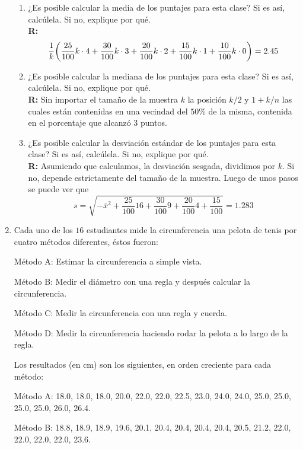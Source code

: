\documentclass[10pt,a4paper]{book}
\begin{document}
\begin{enumerate}
	\begin{enumerate}
		\item ¿Es posible calcular la media de los puntajes para esta clase? Si es así, calcúlela. Si no, explique por qué.\\
		\textbf{R:} $$ \frac{1}{k}\bigg{(}\frac{25}{100}k\cdot4 + \frac{30}{100}k\cdot3 + \frac{20}{100}k\cdot2 + \frac{15}{100}k\cdot1 + \frac{10}{100}k\cdot0 \bigg{)} = 2.45$$
		
		\item ¿Es posible calcular la mediana de los puntajes para esta clase? Si es así, calcúlela. Si no, explique por qué.\\
		\textbf{R:} Sin importar el tamaño de la muestra $ k $ la posición $ k/2 $ y $ 1+ k/n $ las cuales están contenidas en una vecindad del $ 50\% $ de la misma, contenida en el porcentaje que alcanzó $ 3 $ puntos.
		
		\item ¿Es posible calcular la desviación estándar de los puntajes para esta clase? Si es así, calcúlela. Si no, explique por qué.\\
		\textbf{R:} Asumiendo que calculamos, la desviación sesgada, dividimos por $k$. Si no, depende estrictamente del tamaño de la muestra. Luego de unos pasos se puede ver que
		$$s = \sqrt{-\overline{x}^2 + \frac{25}{100}16 +\frac{30}{100}9 +\frac{20}{100}4 + \frac{15}{100} } = 1.283 $$
	\end{enumerate}

	\item Cada uno de los $ 16 $ estudiantes mide la circunferencia una pelota de tenis por cuatro métodos diferentes, éstos fueron:
	
	Método A: Estimar la circunferencia a simple vista.
	
	Método B: Medir el diámetro con una regla y después calcular la circunferencia.
	
	Método C: Medir la circunferencia con una regla y cuerda.
	
	Método D: Medir la circunferencia haciendo rodar la pelota a lo largo de la regla.
	
	Los resultados (en cm) son los siguientes, en orden creciente para cada método:
	
	Método A: 18.0, 18.0, 18.0, 20.0, 22.0, 22.0, 22.5, 23.0, 24.0, 24.0, 25.0, 25.0, 25.0, 25.0, 26.0, 26.4.
	
	Método B: 18.8, 18.9, 18.9, 19.6, 20.1, 20.4, 20.4, 20.4, 20.4, 20.5, 21.2, 22.0, 22.0, 22.0, 22.0, 23.6.
	

\end{enumerate}
\end{document}
